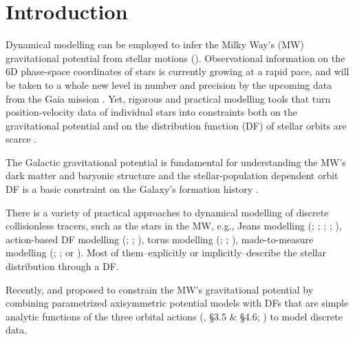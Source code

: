 \section{Introduction} \label{sec:intro}

Dynamical modelling can be employed to infer the Milky Way's (MW) gravitational potential from stellar motions (\citealt{2008gady.book.....B,2011Prama..77...39B,2013A&ARv..21...61R}). Observational information on the 6D phase-space coordinates of stars is currently growing at a rapid pace, and will be taken to a whole new level in number and precision by the upcoming data from the Gaia mission \citep{2001A&A...369..339P}. Yet, rigorous and practical modelling tools that turn position-velocity data of individual stars into constraints both on the gravitational potential and on the distribution function (DF) of stellar orbits are scarce \citep{2013A&ARv..21...61R}.

The Galactic gravitational potential is fundamental for understanding the MW's dark matter and baryonic structure \citep{2013A&ARv..21...61R,2012EPJWC..1910002M,2013PhR...531....1S,2014JPhG...41f3101R} and the stellar-population dependent orbit DF is a basic constraint on the Galaxy's formation history \citep{2013NewAR..57...29B,2013A&ARv..21...61R,2015MNRAS.449.3479S}.

There is a variety of practical approaches to dynamical modelling of discrete collisionless tracers, such as the stars in the MW, e.g., Jeans modelling (\citealt{1989MNRAS.239..605K}; \citealt{2012ApJ...756...89B}; \citealt{2012MNRAS.425.1445G}; \citealt{2013ApJ...772..108Z}; \citealt{2015MNRAS.452..956B}), action-based DF modelling (\citealt{2013ApJ...779..115B}; \citealt{2014MNRAS.445.3133P}; \citealt{2015MNRAS.449.3479S}), torus modelling (\citealt{2008MNRAS.390..429M}; \citealt{2012MNRAS.419.2251M}; \citealt{2013MNRAS.433.1411M}), made-to-measure modelling (\citealt{1996MNRAS.282..223S}; \citealt{2007MNRAS.376...71D}; or \citealt{2014MNRAS.443.2112H}). Most of them--explicitly or implicitly--describe the stellar distribution through a DF. 

Recently, \citet{2012MNRAS.426.1328B} and \citet{2013ApJ...779..115B} proposed to constrain the MW's gravitational potential by combining parametrized axisymmetric potential models with DFs that are simple analytic functions of the three orbital actions (\citealt{2008gady.book.....B}, \S 3.5 \& \S 4.6; \citealt{2011Prama..77...39B}) to model discrete data.



